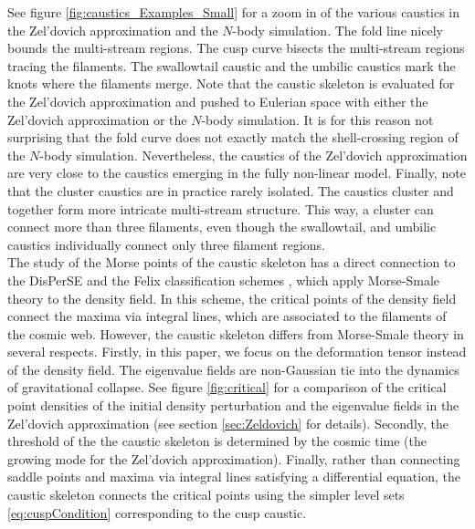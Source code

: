 \documentclass[a4paper, 11pt]{article}
\begin{document}
See figure \ref{fig:caustics_Examples_Small} for a zoom in of the various caustics in the Zel'dovich approximation and the $N$-body simulation. The fold line nicely bounds the multi-stream regions. The cusp curve bisects the multi-stream regions tracing the filaments. The swallowtail caustic and the umbilic caustics mark the knots where the filaments merge. Note that the caustic skeleton is evaluated for the Zel'dovich approximation and pushed to Eulerian space with either the Zel'dovich approximation or the $N$-body simulation. It is for this reason not surprising that the fold curve does not exactly match the shell-crossing region of the $N$-body simulation. Nevertheless, the caustics of the Zel'dovich approximation are very close to the caustics emerging in the fully non-linear model. Finally, note that the cluster caustics are in practice rarely isolated. The caustics cluster and together form more intricate multi-stream structure. This way, a cluster can connect more than three filaments, even though the swallowtail, and umbilic caustics individually connect only three filament regions.\\




The study of the Morse points of the caustic skeleton has a direct connection to the DisPerSE and the Felix classification schemes \cite{Pogosyan:2009, Sousbie:2011a, Sousbie:2011b, Shivashankar:2016}, which apply Morse-Smale theory to the density field. In this scheme, the critical points of the density field connect the maxima via integral lines, which are associated to the filaments of the cosmic web. However, the caustic skeleton differs from Morse-Smale theory in several respects. Firstly, in this paper, we focus on the deformation tensor instead of the density field. The eigenvalue fields are non-Gaussian tie into the dynamics of gravitational collapse. See figure \ref{fig:critical} for a comparison of the critical point densities of the initial density perturbation and the eigenvalue fields in the Zel'dovich approximation (see section \ref{sec:Zeldovich} for details). Secondly, the threshold of the the caustic skeleton is determined by the cosmic time (the growing mode for the Zel'dovich approximation). Finally, rather than connecting saddle points and maxima via integral lines satisfying a differential equation, the caustic skeleton connects the critical points using the simpler level sets \eqref{eq:cuspCondition} corresponding to the cusp caustic.
\end{document}
